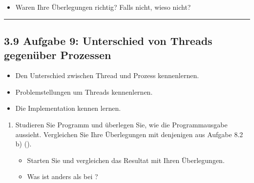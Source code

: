 \documentclass[a4paper,10pt,english]{report}
\begin{document}
\begin{enumerate}
\begin{itemize}
\item {} 
\sphinxAtStartPar
Waren Ihre Überlegungen richtig? Falls nicht, wieso nicht?

\end{itemize}

\begin{sphinxVerbatim}[commandchars=\\\{\}]

\end{sphinxVerbatim}

\end{enumerate}


\bigskip\hrule\bigskip



\subsection{3.9 Aufgabe 9: Unterschied von Threads gegenüber Prozessen}
\label{\detokenize{P07_Prozesse_und_Threads/README:aufgabe-9-unterschied-von-threads-gegenuber-prozessen}}
\sphinxAtStartPar
{}
\begin{itemize}
\item {} 
\sphinxAtStartPar
Den Unterschied zwischen Thread und Prozess kennenlernen.

\item {} 
\sphinxAtStartPar
Problemstellungen um Threads kennenlernen.

\item {} 
\sphinxAtStartPar
Die \sphinxhyphen{}Implementation kennen lernen.

\end{itemize}

\sphinxAtStartPar
{}
\begin{enumerate}
%
\item {} 
\sphinxAtStartPar
Studieren Sie Programm  und überlegen Sie, wie die Programmausgabe aussieht. Vergleichen Sie Ihre Überlegungen mit denjenigen aus Aufgabe 8.2 b)  ().
\begin{itemize}
\item {} 
\sphinxAtStartPar
Starten Sie  und vergleichen das Resultat mit Ihren Überlegungen.

\item {} 
\sphinxAtStartPar
Was ist anders als bei ?

\end{itemize}

\end{enumerate}
\end{document}
